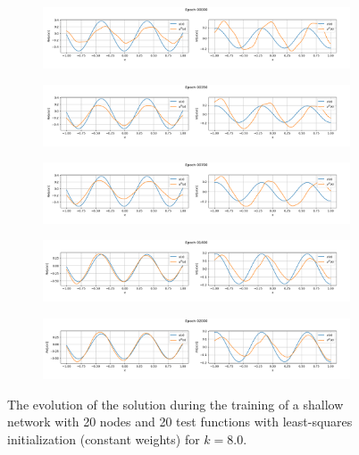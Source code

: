 \begin{figure}[h!]
    \centering
    \begin{subfigure}[b]{0.85\textwidth}
        \includegraphics[width=\textwidth]{img/evolution_lsinit/sol-00000.png}
    \end{subfigure}
    \vfill
    \begin{subfigure}[b]{0.85\textwidth}
        \includegraphics[width=\textwidth]{img/evolution_lsinit/sol-00350.png}
    \end{subfigure}
    \vfill
    \begin{subfigure}[b]{0.85\textwidth}
        \includegraphics[width=\textwidth]{img/evolution_lsinit/sol-00700.png}
    \end{subfigure}
    \vfill
    \begin{subfigure}[b]{0.85\textwidth}
        \includegraphics[width=\textwidth]{img/evolution_lsinit/sol-01400.png}
    \end{subfigure}
    \vfill
    \begin{subfigure}[b]{0.85\textwidth}
        \includegraphics[width=\textwidth]{img/evolution_lsinit/sol-02000.png}
    \end{subfigure}
    \caption{The evolution of the solution during the training of a shallow network with 20 nodes and 20 test functions with least-squares initialization (constant weights) for $k=8.0$.}
    \label{fig:evolutionlsinitsol}
\end{figure}